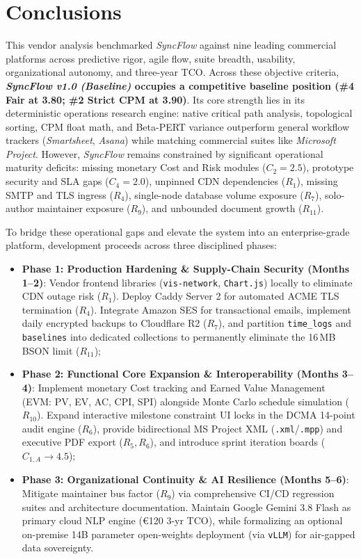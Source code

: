 \chapter{Conclusions}
This vendor analysis benchmarked \textit{SyncFlow} against nine leading commercial platforms across predictive rigor, agile flow, suite breadth, usability, organizational autonomy, and three-year TCO. Across these objective criteria, \textbf{\textit{SyncFlow v1.0 (Baseline)} occupies a competitive baseline position (\#4 Fair at 3.80; \#2 Strict CPM at 3.90)}. Its core strength lies in its deterministic operations research engine: native critical path analysis, topological sorting, CPM float math, and Beta-PERT variance outperform general workflow trackers (\textit{Smartsheet}, \textit{Asana}) while matching commercial suites like \textit{Microsoft Project}. However, \textit{SyncFlow} remains constrained by significant operational maturity deficits: missing monetary Cost and Risk modules ($C_2 = 2.5$), prototype security and SLA gaps ($C_4 = 2.0$), unpinned CDN dependencies ($R_1$), missing SMTP and TLS ingress ($R_4$), single-node database volume exposure ($R_7$), solo-author maintainer exposure ($R_9$), and unbounded document growth ($R_{11}$).

\noindent To bridge these operational gaps and elevate the system into an enterprise-grade platform, development proceeds across three disciplined phases:
\begin{itemize}[itemsep=1pt,topsep=1pt,parsep=0pt]
    \item \textbf{Phase 1: Production Hardening \& Supply-Chain Security (Months 1--2)}: Vendor frontend libraries (\texttt{vis-network}, \texttt{Chart.js}) locally to eliminate CDN outage risk ($R_1$). Deploy Caddy Server 2 for automated ACME TLS termination ($R_4$). Integrate Amazon SES for transactional emails, implement daily encrypted backups to Cloudflare R2 ($R_7$), and partition \texttt{time\_logs} and \texttt{baselines} into dedicated collections to permanently eliminate the 16\,MB BSON limit ($R_{11}$);
    \item \textbf{Phase 2: Functional Core Expansion \& Interoperability (Months 3--4)}: Implement monetary Cost tracking and Earned Value Management (EVM: PV, EV, AC, CPI, SPI) alongside Monte Carlo schedule simulation ($R_{10}$). Expand interactive milestone constraint UI locks in the DCMA 14-point audit engine ($R_6$), provide bidirectional MS Project XML (\texttt{.xml}/\texttt{.mpp}) and executive PDF export ($R_5, R_6$), and introduce sprint iteration boards ($C_{1,A} \to 4.5$);
    \item \textbf{Phase 3: Organizational Continuity \& AI Resilience (Months 5--6)}: Mitigate maintainer bus factor ($R_9$) via comprehensive CI/CD regression suites and architecture documentation. Maintain Google Gemini 3.8 Flash as primary cloud NLP engine (€120 3-yr TCO), while formalizing an optional on-premise 14B parameter open-weights deployment (via \texttt{vLLM}) for air-gapped data sovereignty.
\end{itemize}

